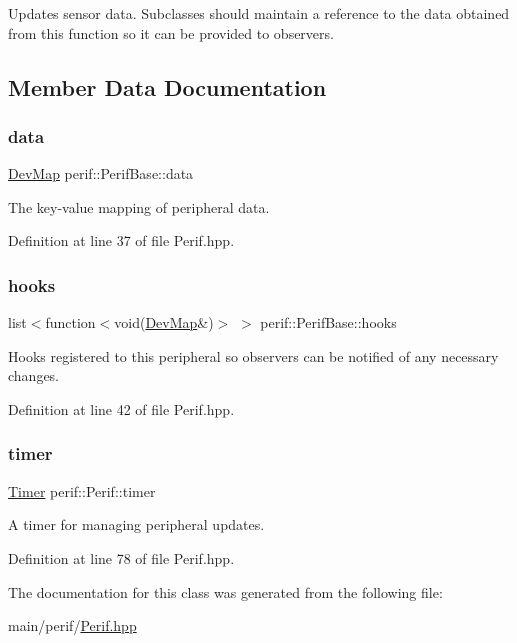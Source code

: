 Updates sensor data. Subclasses should maintain a reference to the data obtained from this function so it can be provided to observers. 

\subsection{Member Data Documentation}
\mbox{\label{classperif_1_1PerifBase_a1a3afaa535fda17e9f97123fffe78765}} 
\subsubsection{\texorpdfstring{data}{data}}
{\footnotesize\ttfamily \mbox{\hyperlink{Perif_8hpp_a358ff4ee6d24694ee7661f0cce14377e}{Dev\+Map}} perif\+::\+Perif\+Base\+::data\hspace{0.3cm}{\ttfamily [inherited]}}

The key-\/value mapping of peripheral data. 

Definition at line 37 of file Perif.\+hpp.

\mbox{\label{classperif_1_1PerifBase_a98964e5ca8384df64881265e0aa6d7b6}} 
\subsubsection{\texorpdfstring{hooks}{hooks}}
{\footnotesize\ttfamily list$<$function$<$void(\mbox{\hyperlink{Perif_8hpp_a358ff4ee6d24694ee7661f0cce14377e}{Dev\+Map}}\&)$>$ $>$ perif\+::\+Perif\+Base\+::hooks\hspace{0.3cm}{\ttfamily [inherited]}}

Hooks registered to this peripheral so observers can be notified of any necessary changes. 

Definition at line 42 of file Perif.\+hpp.

\mbox{\label{classperif_1_1Perif_acfa1256201bead82ccce1a0a8bcc24e1}} 
\subsubsection{\texorpdfstring{timer}{timer}}
{\footnotesize\ttfamily \mbox{\hyperlink{classTimer}{Timer}} perif\+::\+Perif\+::timer\hspace{0.3cm}{\ttfamily [protected]}}

A timer for managing peripheral updates. 

Definition at line 78 of file Perif.\+hpp.



The documentation for this class was generated from the following file\+:\begin{DoxyCompactItemize}
\item 
main/perif/\mbox{\hyperlink{Perif_8hpp}{Perif.\+hpp}}\end{DoxyCompactItemize}
